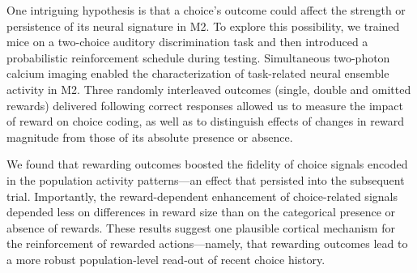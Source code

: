 One intriguing hypothesis is that a choice’s outcome could affect the strength or persistence of its neural signature in M2. To explore this possibility, we trained mice on a two-choice auditory discrimination task and then introduced a probabilistic reinforcement schedule during testing. Simultaneous two-photon calcium imaging enabled the characterization of task-related neural ensemble activity in M2. Three randomly interleaved outcomes (single, double and omitted rewards) delivered following correct responses allowed us to measure the impact of reward on choice coding, as well as to distinguish effects of changes in reward magnitude from those of its absolute presence or absence. 

We found that rewarding outcomes boosted the fidelity of choice signals encoded in the population activity patterns—an effect that persisted into the subsequent trial. Importantly, the reward-dependent enhancement of choice-related signals depended less on differences in reward size than on the categorical presence or absence of rewards. These results suggest one plausible cortical mechanism for the reinforcement of rewarded actions—namely, that rewarding outcomes lead to a more robust population-level read-out of recent choice history.